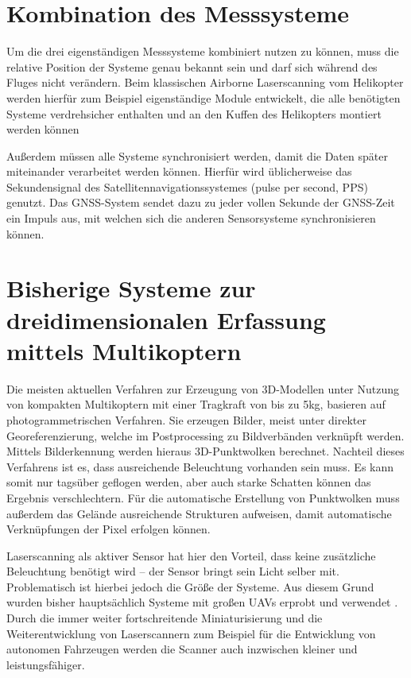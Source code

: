 \documentclass[a4paper,12pt,bibliography=totoc, listof=totoc,titlepage,pointlessnumbers]{scrreprt}
\begin{document}

\section{Kombination des Messsysteme}
Um die drei eigenständigen Messsysteme kombiniert nutzen zu können, muss die relative Position der Systeme genau bekannt sein und darf sich während des Fluges nicht verändern. Beim klassischen Airborne Laserscanning vom Helikopter werden hierfür zum Beispiel eigenständige Module entwickelt, die alle benötigten Systeme verdrehsicher enthalten und an den Kuffen des Helikopters montiert werden können \citep[S. 23f]{beraldin}

Außerdem müssen alle Systeme synchronisiert werden, damit die Daten später miteinander verarbeitet werden können. Hierfür wird üblicherweise das Sekundensignal des Satellitennavigationssystemes (pulse per second, PPS) genutzt. Das GNSS-System sendet dazu zu jeder vollen Sekunde der GNSS-Zeit ein Impuls aus, mit welchen sich die anderen Sensorsysteme synchronisieren können. 

\section{Bisherige Systeme zur dreidimensionalen Erfassung mittels Multikoptern}
Die meisten aktuellen Verfahren zur Erzeugung von 3D-Modellen unter Nutzung von kompakten Multikoptern mit einer Tragkraft von bis zu 5kg, basieren auf photogrammetrischen Verfahren. Sie erzeugen Bilder, meist unter direkter Georeferenzierung, welche im Postprocessing zu Bildverbänden verknüpft werden. Mittels Bilderkennung werden hieraus 3D-Punktwolken berechnet. Nachteil dieses Verfahrens ist es, dass ausreichende Beleuchtung vorhanden sein muss. Es kann somit nur tagsüber geflogen werden, aber auch starke Schatten können das Ergebnis verschlechtern. Für die automatische Erstellung von Punktwolken muss außerdem das Gelände ausreichende Strukturen aufweisen, damit automatische Verknüpfungen der Pixel erfolgen können.

Laserscanning als aktiver Sensor hat hier den Vorteil, dass keine zusätzliche Beleuchtung benötigt wird -- der Sensor bringt sein Licht selber mit. Problematisch ist hierbei jedoch die Größe der Systeme. Aus diesem Grund wurden bisher hauptsächlich Systeme mit großen UAVs erprobt und verwendet \citep[S. 19]{uav}. Durch die immer weiter fortschreitende Miniaturisierung und die Weiterentwicklung von Laserscannern zum Beispiel für die Entwicklung von autonomen Fahrzeugen werden die Scanner auch inzwischen kleiner und leistungsfähiger.
\end{document}
